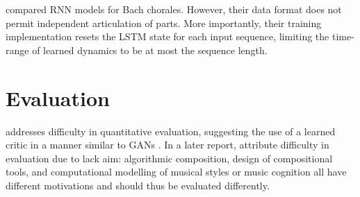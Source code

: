 \documentclass[dissertation.tex]{subfiles}
\begin{document}
\cite{Brien2016} compared RNN models for Bach chorales. However, their data format does not permit independent
articulation of parts. More importantly, their training implementation resets the LSTM state for each input
sequence, limiting the time-range of learned dynamics to be at most the sequence length.

\section{Evaluation}

\cite{pearce2001towards} addresses difficulty in quantitative evaluation,
suggesting the use of a learned critic in a manner similar to GANs
\cite{goodfellow2014generative}. In a later report,
\cite{pearce2002motivations} attribute difficulty in evaluation due to lack
aim: algorithmic composition, design of compositional tools, and computational
modelling of musical styles or music cognition all have different motivations
and should thus be evaluated differently.

\printbibliography
\end{document}
